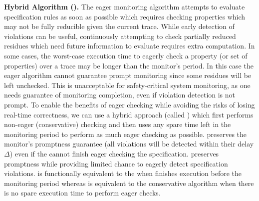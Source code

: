 \noindent\textbf{Hybrid Algorithm (\ha).}
The eager monitoring algorithm attempts to evaluate specification rules as soon as possible
which requires checking properties which may not be fully reducible given the current trace.
While early detection of violations can be useful, continuously attempting to check
partially reduced residues which need future information to evaluate requires extra computation.
In some cases, the worst-case execution time to eagerly check a property (or set of properties)
over a trace may be longer than the monitor's period.
In this case the eager algorithm cannot guarantee prompt monitoring since some
residues will be left unchecked. This is unacceptable for
safety-critical system monitoring, as one needs guarantee of monitoring completion,
even if violation detection is not prompt.
%
To enable the benefits of eager checking while avoiding the risks of losing
real-time correctness, we can use a hybrid approach (called \ha) which first performs non-eager
(conservative) checking and then uses any spare time left in the monitoring period to
perform as much eager checking as possible.
\ha preserves the monitor's promptness guarantee (all violations will be
detected within their delay $\Delta$) even if the \monitor cannot finish eager
checking the specification.
\ha preserves promptness while providing limited chance to eagerly detect specification violations.
\ha is functionally equivalent to the \monitor when \monitor finishes
execution before the monitoring period whereas \ha is
equivalent to the conservative
algorithm when there is no spare execution time to perform eager checks.
